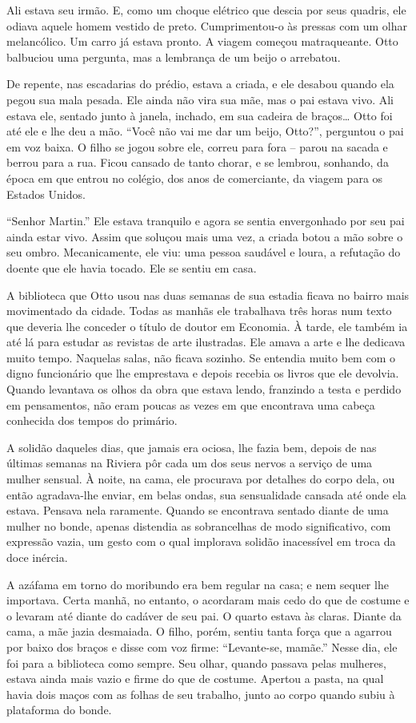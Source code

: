 Ali estava seu irmão. E, como um choque elétrico que descia por seus
quadris, ele odiava aquele homem vestido de preto. Cumprimentou-o às
pressas com um olhar melancólico. Um carro já estava pronto. A viagem
começou matraqueante. Otto balbuciou uma pergunta, mas a lembrança de um
beijo o arrebatou.

De repente, nas escadarias do prédio, estava a criada, e ele desabou
quando ela pegou sua mala pesada. Ele ainda não vira sua mãe, mas o pai
estava vivo. Ali estava ele, sentado junto à janela, inchado, em sua
cadeira de braços\ldots{} Otto foi até ele e lhe deu a mão. ``Você não vai me
dar um beijo, Otto?'', perguntou o pai em voz baixa. O filho se jogou
sobre ele, correu para fora -- parou na sacada e berrou para a rua.
Ficou cansado de tanto chorar, e se lembrou, sonhando, da época em que
entrou no colégio, dos anos de comerciante, da viagem para os Estados
Unidos.

``Senhor Martin.'' Ele estava tranquilo e agora se sentia envergonhado
por seu pai ainda estar vivo. Assim que soluçou mais uma vez, a criada
botou a mão sobre o seu ombro. Mecanicamente, ele viu: uma pessoa
saudável e loura, a refutação do doente que ele havia tocado. Ele se
sentiu em casa.

A biblioteca que Otto usou nas duas semanas de sua estadia ficava no
bairro mais movimentado da cidade. Todas as manhãs ele trabalhava três
horas num texto que deveria lhe conceder o título de doutor em Economia.
À tarde, ele também ia até lá para estudar as revistas de arte
ilustradas. Ele amava a arte e lhe dedicava muito tempo. Naquelas salas,
não ficava sozinho. Se entendia muito bem com o digno funcionário que
lhe emprestava e depois recebia os livros que ele devolvia. Quando
levantava os olhos da obra que estava lendo, franzindo a testa e perdido
em pensamentos, não eram poucas as vezes em que encontrava uma cabeça
conhecida dos tempos do primário.

A solidão daqueles dias, que jamais era ociosa, lhe fazia bem, depois de
nas últimas semanas na Riviera pôr cada um dos seus nervos a serviço de
uma mulher sensual. À noite, na cama, ele procurava por detalhes do
corpo dela, ou então agradava-lhe enviar, em belas ondas, sua
sensualidade cansada até onde ela estava. Pensava nela raramente. Quando
se encontrava sentado diante de uma mulher no bonde, apenas distendia as
sobrancelhas de modo significativo, com expressão vazia, um gesto com o
qual implorava solidão inacessível em troca da doce inércia.

A azáfama em torno do moribundo era bem regular na casa; e nem sequer
lhe importava. Certa manhã, no entanto, o acordaram mais cedo do que de
costume e o levaram até diante do cadáver de seu pai. O quarto estava às
claras. Diante da cama, a mãe jazia desmaiada. O filho, porém, sentiu
tanta força que a agarrou por baixo dos braços e disse com voz firme:
``Levante-se, mamãe.'' Nesse dia, ele foi para a biblioteca como sempre.
Seu olhar, quando passava pelas mulheres, estava ainda mais vazio e
firme do que de costume. Apertou a pasta, na qual havia dois maços com
as folhas de seu trabalho, junto ao corpo quando subiu à plataforma do
bonde.

